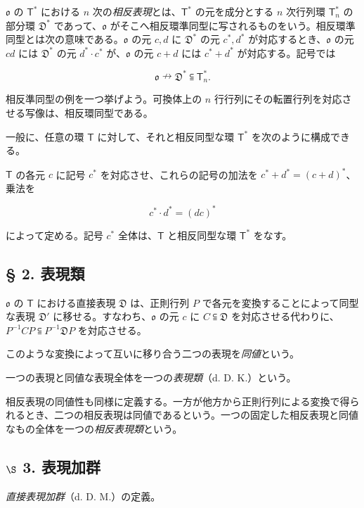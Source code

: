 $\mathfrak{o}$ の $\mathsf T^*$ における $n$ 次の\emph{相反表現}とは、$\mathsf T^*$ の元を成分とする $n$ 次行列環 $\mathsf T_n^*$ の部分環 $\mathfrak D^*$ であって、$\mathfrak{o}$ がそこへ相反環準同型に写されるものをいう。相反環準同型とは次の意味である。$\mathfrak{o}$ の元 $c,d$ に $\mathfrak D^*$ の元 $c^*,d^*$ が対応するとき、$\mathfrak{o}$ の元 $cd$ には $\mathfrak D^*$ の元 $d^*\cdot c^*$ が、$\mathfrak{o}$ の元 $c+d$ には $c^*+d^*$ が対応する。記号では

\[
\mathfrak{o}\nrightarrow\mathfrak D^*\subseteqq\mathsf T_n^*.
\]

相反準同型の例を一つ挙げよう。可換体上の $n$ 行行列にその転置行列を対応させる写像は、相反環同型である。

一般に、任意の環 $\mathsf T$ に対して、それと相反同型な環 $\mathsf T^*$ を次のように構成できる。

$\mathsf T$ の各元 $c$ に記号 $c^*$ を対応させ、これらの記号の加法を $c^*+d^*=(c+d)^*$、乗法を

\[
c^*\cdot d^*=(dc)^*
\]

によって定める。記号 $c^*$ 全体は、$\mathsf T$ と相反同型な環 $\mathsf T^*$ をなす。

\subsection*{§ 2. 表現類}\label{darstellungsklassen}

$\mathfrak{o}$ の $\mathsf T$ における直接表現 $\mathfrak D$ は、正則行列 $P$ で各元を変換することによって同型な表現 $\mathfrak D'$ に移せる。すなわち、$\mathfrak{o}$ の元 $c$ に $C\subseteqq\mathfrak D$ を対応させる代わりに、$P^{-1}CP\subseteqq P^{-1}\mathfrak D P$ を対応させる。

このような変換によって互いに移り合う二つの表現を\emph{同値}という。

一つの表現と同値な表現全体を一つの\emph{表現類}（d. D. K.）という。

相反表現の同値性も同様に定義する。一方が他方から正則行列による変換で得られるとき、二つの相反表現は同値であるという。一つの固定した相反表現と同値なもの全体を一つの\emph{相反表現類}という。

\subsection*{\texorpdfstring{$\S$ 3. 表現加群}{\textbackslash S 3. Darstellungsmoduln}}\label{s-3.-darstellungsmoduln}

\emph{直接表現加群}（d. D. M.）の定義。

